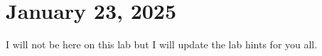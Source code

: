 \documentclass[11pt]{article}
\begin{document}
\section{January 23, 2025}
I will not be here on this lab but I will update the lab hints for you all.
\end{document}
